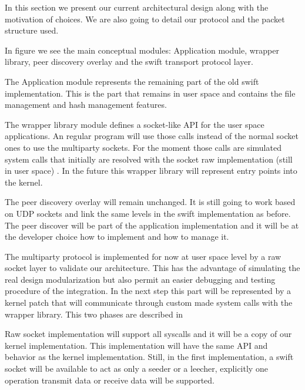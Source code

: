 

In this section we present our current architectural design along with the motivation of choices. We are also going to 
detail our protocol and the packet structure used.

In figure  we see the main conceptual modules: Application module, 
wrapper library, peer discovery overlay and the swift transport protocol layer.


The Application module represents the remaining part of the old swift implementation. This is the part that remains in
user space and contains the file management and hash management features. 

The wrapper library module defines a socket-like API for the user space applications. An regular program will use those
calls instead of the normal socket ones to use the multiparty sockets. For the moment those calls are simulated system
calls that initially are resolved with the socket raw implementation (still in user space) . 
In the future this wrapper library will represent entry points into the kernel.

The peer discovery overlay will remain unchanged. It is still going to work based on UDP sockets and link the same
levels in the swift implementation as before. The peer discover will be part of the application implementation and it
will be at the developer choice how to implement and how to manage it. 

The multiparty protocol is implemented for now at user space level by a raw socket layer to validate our architecture.
This has the advantage of simulating the real design modularization but also permit an easier debugging and testing
procedure of the integration. In the next step this part will be represented by a kernel patch that will communicate
through custom made system calls with the wrapper library. This two phases are described in


Raw socket implementation will support all syscalls and it will be a copy of our kernel implementation. 
This implementation will have the same API and behavior as the kernel implementation. Still, in the first
implementation, a swift socket will be available to act as only a seeder or a leecher, explicitly one operation transmit
data or receive data will be supported.
 
